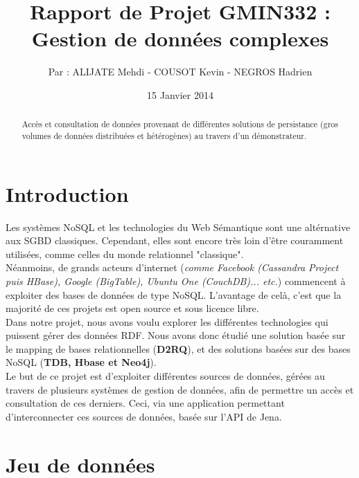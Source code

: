 \documentclass{article}
\title{Rapport de Projet GMIN332 :\\ Gestion de données complexes}
\author{Par : ALIJATE Mehdi - COUSOT Kevin - NEGROS Hadrien}
\date{15 Janvier 2014}
\begin{document}
\maketitle
\tableofcontents

\begin{abstract}
Accès et consultation de données provenant de différentes solutions de persistance (gros volumes de données distribuées et hétérogènes) au travers d'un démonstrateur.
\end{abstract}








\newpage 
\section{Introduction}\label{sec:intro}
Les systèmes NoSQL et les technologies du Web Sémantique sont une altérnative aux SGBD classiques. Cependant, elles sont encore très loin d'être couramment utilisées, comme celles du monde relationnel "classique". \\
Néanmoins, de grands acteurs d'internet (\textit{comme Facebook (Cassandra Project puis HBase), Google (BigTable), Ubuntu One (CouchDB)... etc.}) commencent à exploiter des bases de données de type NoSQL. L'avantage de celà, c'est que la majorité de ces projets est open source et sous licence libre.
\\
Dans notre projet, nous avons voulu explorer les différentes technologies qui puissent gérer des données RDF. Nous avons donc étudié une solution basée sur le mapping de bases relationnelles (\textbf{D2RQ}), et des solutions basées sur des bases NoSQL (\textbf{TDB, Hbase et Neo4j}).
\\
Le but de ce projet est d’exploiter différentes sources de données, gérées au travers de plusieurs systèmes de gestion de données, afin de permettre un accès et consultation de ces derniers. Ceci, via une application permettant d'interconnecter ces sources de données, basée sur l'API de Jena.






\section{Jeu de données}
\end{document}
